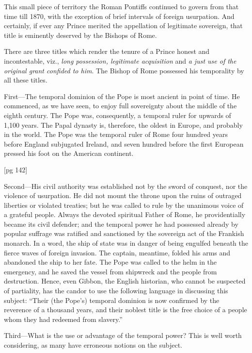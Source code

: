 This small piece of territory the Roman Pontiffs
continued to govern from that time till 1870, with
the exception of brief intervals of foreign usurpation.
And certainly, if ever any Prince merited
the appellation of legitimate sovereign, that title
is eminently deserved by the Bishops of Rome.


There are three titles which render the tenure of
a Prince honest and incontestable, viz., \emph{long possession,
legitimate acquisition} and \emph{a just use of the
original grant confided to him}. The Bishop of
Rome possessed his temporality by all these titles.

First—The temporal dominion of the Pope is
most ancient in point of time. He commenced, as
we have seen, to enjoy full sovereignty about the
middle of the eighth century. The Pope was, consequently,
a temporal ruler for upwards of 1,100
years. The Papal dynasty is, therefore, the oldest
in Europe, and probably in the world. The Pope
was the temporal ruler of Rome four hundred
years before England subjugated Ireland, and
seven hundred before the first European pressed
his foot on the American continent.

[pg 142]

Second—His civil authority was established not
by the sword of conquest, nor the violence of usurpation.
He did not mount the throne upon the
ruins of outraged liberties or violated treaties; but
he was called to rule by the unanimous voice of a
grateful people. Always the devoted spiritual
Father of Rome, he providentially became its civil
defender; and the temporal power he had possessed
already by popular suffrage was ratified
and sanctioned by the sovereign act of the Frankish
monarch. In a word, the ship of state was in
danger of being engulfed beneath the fierce waves
of foreign invasion. The captain, meantime, folded
his arms and abandoned the ship to her fate. The
Pope was called to the helm in the emergency, and
he saved the vessel from shipwreck and the people
from destruction. Hence, even Gibbon, the English
historian, who cannot be suspected of partiality,
has the candor to use the following language in discussing
this subject: “Their (the Pope's) temporal
dominion is now confirmed by the reverence of a
thousand years, and their noblest title is the free
choice of a people whom they had redeemed from
slavery.”

Third—What is the use or advantage of the temporal
power? This is well worth considering, as
many have erroneous notions on the subject.

